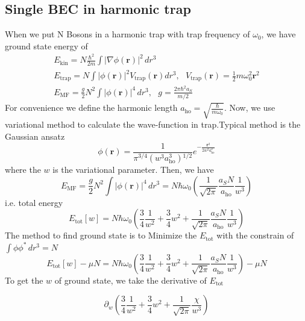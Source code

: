 \subsection{Single BEC in harmonic trap}
When we put N Bosons in a harmonic trap with trap frequency of $\omega _0$, we have ground state energy of
\begin{equation}
\begin{split}
E_{\text{kin}}=N \frac{\hbar ^2}{2m}\int \left| \nabla \phi (\pmb{r})\right| ^2 \, dr^3\\
E_{\text{trap}}=N\int \left| \phi (\pmb{r})\right| ^2V_{\text{trap}}(\pmb{r})dr^3,\text{   }V_{\text{trap}}(\pmb{r})=\frac{1}{2}m \omega _0^2\pmb{r}^2\\
E_{\text{MF}}=\frac{g}{2}N^2\int \left| \phi (\pmb{r})\right| ^4 \, dr^3,\text{    }g=\frac{2\pi  \hbar ^2a_S}{m/2}
\end{split}
\end{equation}
For convenience we define the harmonic length $a_{\text{ho}}=\sqrt{\frac{\hbar }{m \omega _0}}$.
Now, we use variational method to calculate the wave-function in trap.Typical method is the Gaussian ansatz
\begin{equation}
\phi (\pmb{r})=\frac{1}{\pi^{3/4}\left(w^3a_{\text{ho}}^3\right){}^{1/2}}e^{-\frac{\pmb{r}^2}{2w^2a_{\text{ho}}^2}}
\end{equation}
where the $w$ is the variational parameter. Then, we have
\begin{equation}
E_{\text{MF}}=\frac{g}{2}N^2\int\left|\phi(\pmb{r})\right| ^4 \, dr^3=N \hbar\omega_0\left(\frac{1}{\sqrt{2\pi}}\frac{a_SN}{a_{\text{ho}}}\frac{1}{w^3}\right)
\end{equation}
i.e. total energy 
\begin{equation}
E_{\text{tot}}[w]=N\hbar\omega_0\left(\frac{3}{4}\frac{1}{w^2}+\frac{3}{4}w^2+\frac{1}{\sqrt{2\pi}}\frac{a_SN}{a_{\text{ho}}}\frac{1}{w^3}\right)
\end{equation}
The method to find ground state is to Minimize the $E_{\text{tot} }$ with the constrain of $\int \phi \phi ^* \, dr^3=N$
\begin{equation}
E_{\text{tot}}[w]-\mu  N=N \hbar  \omega _0\left(\frac{3}{4}\frac{1}{w^2}+\frac{3}{4}w^2+\frac{1}{\sqrt{2\pi }}\frac{a_SN}{a_{\text{ho}}}\frac{1}{w^3}\right)
-\mu  N
\end{equation}
To get the $w$ of ground state, we take the derivative of $E_{\text{tot}}$
\begin{doublespace}
\noindent
\begin{equation}
{\partial _w\left(\frac{3}{4}\frac{1}{w^2}+\frac{3}{4}w^2+\frac{1}{\sqrt{2\pi }}\frac{\chi }{w^3}\right)}
\end{equation}
\end{doublespace}
